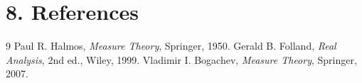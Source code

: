 \section*{8. References}

\begin{thebibliography}{9}
 Paul R. Halmos, \emph{Measure Theory}, Springer, 1950.
 Gerald B. Folland, \emph{Real Analysis}, 2nd ed., Wiley, 1999.
 Vladimir I. Bogachev, \emph{Measure Theory}, Springer, 2007.
\end{thebibliography}